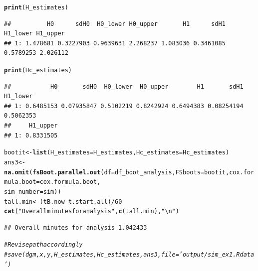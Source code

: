 \documentclass[smallextended]{svjour3}
\makeatletter
\newcommand{\hlnum}[1]{\textcolor[rgb]{0.686,0.059,0.569}{#1}}%
\newcommand{\hlstr}[1]{\textcolor[rgb]{0.192,0.494,0.8}{#1}}%
\newcommand{\hlcom}[1]{\textcolor[rgb]{0.678,0.584,0.686}{\textit{#1}}}%
\newcommand{\hlopt}[1]{\textcolor[rgb]{0,0,0}{#1}}%
\newcommand{\hlstd}[1]{\textcolor[rgb]{0.345,0.345,0.345}{#1}}%
\newcommand{\hlkwb}[1]{\textcolor[rgb]{0.69,0.353,0.396}{#1}}%
\newcommand{\hlkwc}[1]{\textcolor[rgb]{0.333,0.667,0.333}{#1}}%
\newcommand{\hlkwd}[1]{\textcolor[rgb]{0.737,0.353,0.396}{\textbf{#1}}}%
\newenvironment{kframe}{%
 \def\at@end@of@kframe{}%
 \ifinner\ifhmode%
  \def\at@end@of@kframe{\end{minipage}}%
  \begin{minipage}{\columnwidth}%
 \fi\fi%
 \def\FrameCommand##1{\hskip\@totalleftmargin \hskip-\fboxsep
 \colorbox{shadecolor}{##1}\hskip-\fboxsep
     \hskip-\linewidth \hskip-\@totalleftmargin \hskip\columnwidth}%
 \MakeFramed {\advance\hsize-\width
   \@totalleftmargin\z@ \linewidth\hsize
   \@setminipage}}%
 {\par\unskip\endMakeFramed%
 \at@end@of@kframe}
\newenvironment{knitrout}{}{} %
\makeatother
\begin{document}
\begin{knitrout}
\begin{kframe}
\begin{alltt}
\hlkwd{print}\hlstd{(H_estimates)}
\end{alltt}
\begin{verbatim}
##          H0      sdH0  H0_lower H0_upper       H1      sdH1  H1_lower H1_upper
## 1: 1.478681 0.3227903 0.9639631 2.268237 1.083036 0.3461085 0.5789253 2.026112
\end{verbatim}
\begin{alltt}
\hlkwd{print}\hlstd{(Hc_estimates)}
\end{alltt}
\begin{verbatim}
##           H0       sdH0  H0_lower  H0_upper        H1       sdH1  H1_lower
## 1: 0.6485153 0.07935847 0.5102219 0.8242924 0.6494383 0.08254194 0.5062353
##     H1_upper
## 1: 0.8331505
\end{verbatim}
\begin{alltt}
\hlstd{bootit} \hlkwb{<-} \hlkwd{list}\hlstd{(}\hlkwc{H_estimates} \hlstd{= H_estimates,} \hlkwc{Hc_estimates} \hlstd{= Hc_estimates)}
\hlstd{ans3} \hlkwb{<-} \hlkwd{na.omit}\hlstd{(}\hlkwd{fsBoot.parallel.out}\hlstd{(}\hlkwc{df} \hlstd{= df_boot_analysis,} \hlkwc{FSboots} \hlstd{= bootit,} \hlkwc{cox.formula.boot} \hlstd{= cox.formula.boot,}
    \hlkwc{sim_number} \hlstd{= sim))}
\hlstd{tall.min} \hlkwb{<-} \hlstd{(tB.now} \hlopt{-} \hlstd{t.start.all)}\hlopt{/}\hlnum{60}
\hlkwd{cat}\hlstd{(}\hlstr{"Overall minutes for analysis"}\hlstd{,} \hlkwd{c}\hlstd{(tall.min),} \hlstr{"\textbackslash{}n"}\hlstd{)}
\end{alltt}
\begin{verbatim}
## Overall minutes for analysis 1.042433
\end{verbatim}
\begin{alltt}
\hlcom{# Revise path accordingly}
\hlcom{# save(dgm,x,y,H_estimates,Hc_estimates,ans3,file='output/sim_ex1.Rdata')}
\end{alltt}
\end{kframe}
\end{knitrout}



\end{document}

